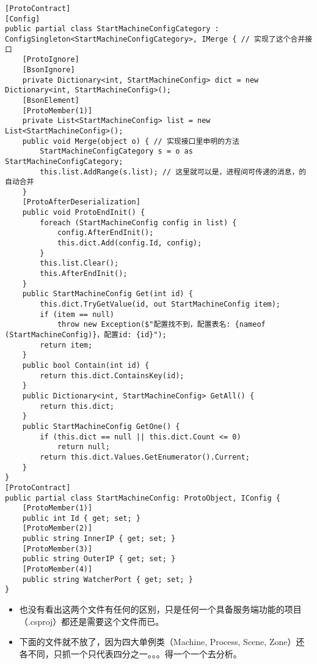 \documentclass[9pt, b5paper]{article}
\begin{document}
\begin{verbatim}
[ProtoContract]
[Config]
public partial class StartMachineConfigCategory : ConfigSingleton<StartMachineConfigCategory>, IMerge { // 实现了这个合并接口
    [ProtoIgnore]
    [BsonIgnore]
    private Dictionary<int, StartMachineConfig> dict = new Dictionary<int, StartMachineConfig>();
    [BsonElement]
    [ProtoMember(1)]
    private List<StartMachineConfig> list = new List<StartMachineConfig>();
    public void Merge(object o) { // 实现接口里申明的方法
        StartMachineConfigCategory s = o as StartMachineConfigCategory;
        this.list.AddRange(s.list); // 这里就可以是，进程间可传递的消息，的自动合并
    }
    [ProtoAfterDeserialization]        
    public void ProtoEndInit() {
        foreach (StartMachineConfig config in list) {
            config.AfterEndInit();
            this.dict.Add(config.Id, config);
        }
        this.list.Clear();
        this.AfterEndInit();
    }
    public StartMachineConfig Get(int id) {
        this.dict.TryGetValue(id, out StartMachineConfig item);
        if (item == null) 
            throw new Exception($"配置找不到，配置表名: {nameof (StartMachineConfig)}，配置id: {id}");
        return item;
    }
    public bool Contain(int id) {
        return this.dict.ContainsKey(id);
    }
    public Dictionary<int, StartMachineConfig> GetAll() {
        return this.dict;
    }
    public StartMachineConfig GetOne() {
        if (this.dict == null || this.dict.Count <= 0) 
            return null;
        return this.dict.Values.GetEnumerator().Current;
    }
}
[ProtoContract]
public partial class StartMachineConfig: ProtoObject, IConfig {
    [ProtoMember(1)]
    public int Id { get; set; }
    [ProtoMember(2)]
    public string InnerIP { get; set; }
    [ProtoMember(3)]
    public string OuterIP { get; set; }
    [ProtoMember(4)]
    public string WatcherPort { get; set; }
}
\end{verbatim}
\begin{itemize}
\item 也没有看出这两个文件有任何的区别，只是任何一个具备服务端功能的项目（.csproj）都还是需要这个文件而已。
\item 下面的文件就不放了，因为四大单例类（Machine, Process, Scene, Zone）还各不同，只抓一个只代表四分之一。。。得一个一个去分析。
\end{itemize}
\end{document}
